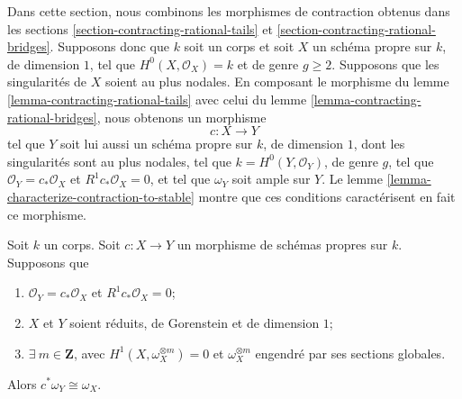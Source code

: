 \noindent
Dans cette section, nous combinons les morphismes de contraction obtenus dans les sections \ref{section-contracting-rational-tails} et \ref{section-contracting-rational-bridges}. Supposons donc que $k$ soit un corps et soit $X$ un schéma propre sur $k$, de dimension $1$, tel que $H^0(X, \mathcal{O}_X) = k$ et de genre $g \geq 2$. Supposons que les singularités de $X$ soient au plus nodales. En composant le morphisme du lemme \ref{lemma-contracting-rational-tails} avec celui du lemme \ref{lemma-contracting-rational-bridges}, nous obtenons un morphisme $$
c : X \longrightarrow Y
$$ tel que $Y$ soit lui aussi un schéma propre sur $k$, de dimension $1$, dont les singularités sont au plus nodales, tel que $k = H^0(Y, \mathcal{O}_Y)$, de genre $g$, tel que $\mathcal{O}_Y = c_*\mathcal{O}_X$ et $R^1c_*\mathcal{O}_X = 0$, et tel que $\omega_Y$ soit ample sur $Y$. Le lemme \ref{lemma-characterize-contraction-to-stable} montre que ces conditions caractérisent en fait ce morphisme.

\begin{lemma}
\label{lemma-contract-gorenstein-canonical}
Soit $k$ un corps. Soit $c : X \to Y$ un morphisme de schémas propres sur $k$. Supposons que \begin{enumerate} \item $\mathcal{O}_Y = c_*\mathcal{O}_X$ et $R^1c_*\mathcal{O}_X = 0$; \item $X$ et $Y$ soient réduits, de Gorenstein et de dimension $1$; \item $\exists\ m \in \mathbf{Z}$, avec $H^1(X, \omega_X^{\otimes m}) = 0$ et $\omega_X^{\otimes m}$ engendré par ses sections globales. \end{enumerate} Alors $c^*\omega_Y \cong \omega_X$.
\end{lemma}


